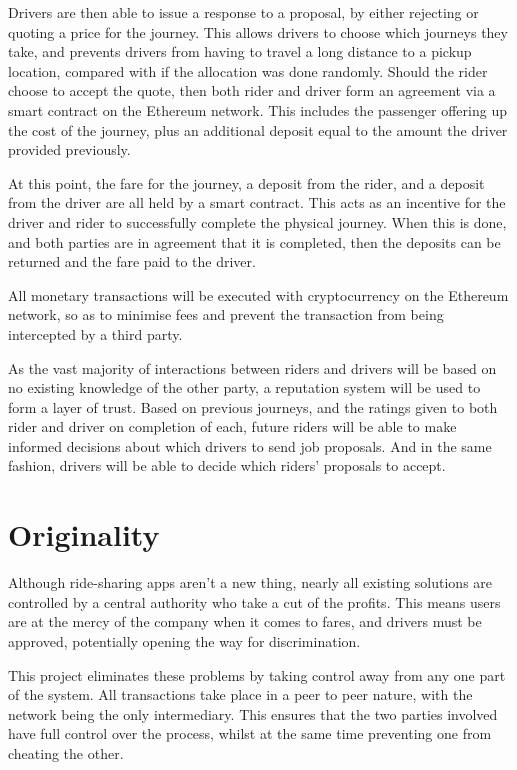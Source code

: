 \documentclass{article}
\begin{document}
Drivers are then able to issue a response to a proposal, by either rejecting or quoting a price for the journey. This allows drivers to choose which journeys they take, and prevents drivers from having to travel a long distance to a pickup location, compared with if the allocation was done randomly. Should the rider choose to accept the quote, then both rider and driver form an agreement via a smart contract on the Ethereum network. This includes the passenger offering up the cost of the journey, plus an additional deposit equal to the amount the driver provided previously.

At this point, the fare for the journey, a deposit from the rider, and a deposit from the driver are all held by a smart contract. This acts as an incentive for the driver and rider to successfully complete the physical journey. When this is done, and both parties are in agreement that it is completed, then the deposits can be returned and the fare paid to the driver.

All monetary transactions will be executed with cryptocurrency on the Ethereum network, so as to minimise fees and prevent the transaction from being intercepted by a third party.

As the vast majority of interactions between riders and drivers will be based on no existing knowledge of the other party, a reputation system will be used to form a layer of trust. Based on previous journeys, and the ratings given to both rider and driver on completion of each, future riders will be able to make informed decisions about which drivers to send job proposals. And in the same fashion, drivers will be able to decide which riders’ proposals to accept.

\section{Originality}

Although ride-sharing apps aren’t a new thing, nearly all existing solutions are controlled by a central authority who take a cut of the profits. This means users are at the mercy of the company when it comes to fares, and drivers must be approved, potentially opening the way for discrimination.

This project eliminates these problems by taking control away from any one part of the system. All transactions take place in a peer to peer nature, with the network being the only intermediary. This ensures that the two parties involved have full control over the process, whilst at the same time preventing one from cheating the other.
\end{document}
